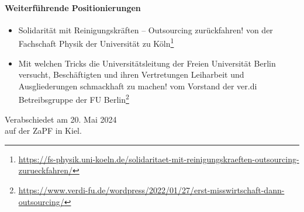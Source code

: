 \documentclass[DIV=calc]{scrartcl}
\let\oldgrqq=\grqq
\def\grqq{\oldgrqq\xspace}
\begin{document}
\vspace{-5mm}\paragraph{Weiterführende Positionierungen}
\begin{itemize}
    \item \glqq Solidarität mit Reinigungskräften – Outsourcing zurückfahren!\grqq von der Fachschaft Physik der Universität zu Köln\footnote{\url{https://fs-physik.uni-koeln.de/solidaritaet-mit-reinigungskraeften-outsourcing-zurueckfahren/}}
    \item \glqq Mit welchen Tricks die Universitätsleitung der Freien Universität Berlin versucht, Beschäftigten und ihren Vertretungen Leiharbeit und Ausgliederungen schmackhaft zu machen!\grqq vom Vorstand der ver.di Betreibsgruppe der FU Berlin\footnote{\url{https://www.verdi-fu.de/wordpress/2022/01/27/erst-misswirtschaft-dann-outsourcing/}}
\end{itemize}


%
\vfill
\begin{flushright}
	Verabschiedet am 20. Mai 2024 \\
	auf der ZaPF in Kiel.
\end{flushright}
\end{document}
